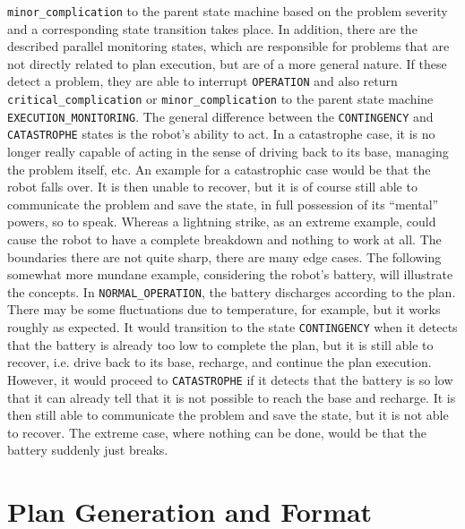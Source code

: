 \documentclass[english, master, utf8]{base/thesis_KBS}
\newcommand{\code}[1]{\colorbox{light-gray}{\texttt{#1}}}
\begin{document}
\code{minor\_complication} to the parent state machine based on the problem severity and a corresponding state transition takes place.
In addition, there are the described parallel monitoring states, which are responsible for problems that are not directly related to plan execution, but are of a more general nature.
If these detect a problem, they are able to interrupt \code{OPERATION} and also return \code{critical\_complication} or \code{minor\_complication} to the parent state machine
\code{EXECUTION\_MONITORING}.\newline
The general difference between the \code{CONTINGENCY} and \code{CATASTROPHE} states is the robot's ability to act. 
In a catastrophe case, it is no longer really capable of acting in the sense of driving back to its base, managing the problem itself, etc. 
An example for a catastrophic case would be that the robot falls over. It is then unable to recover, but it is of course still able to communicate the problem
and save the state, in full possession of its ``mental'' powers, so to speak. Whereas a lightning strike, as an extreme example, could cause the robot to have a 
complete breakdown and nothing to work at all. The boundaries there are not quite sharp, there are many edge cases.
The following somewhat more mundane example, considering the robot's battery, will illustrate the concepts.
In \code{NORMAL\_OPERATION}, the battery discharges according to the plan. There may be some fluctuations due to temperature, for example, but it works roughly as expected.
It would transition to the state \code{CONTINGENCY} when it detects that the battery is already too low to complete the plan, but it is still able to recover,
i.e. drive back to its base, recharge, and continue the plan execution. However, it would proceed to \code{CATASTROPHE} if it detects that the battery is so low
that it can already tell that it is not possible to reach the base and recharge. It is then still able to communicate the problem and save the state, but it is not able
to recover. The extreme case, where nothing can be done, would be that the battery suddenly just breaks.

\pagebreak

\section{Plan Generation and Format}
\label{sec:plan_generation}
\end{document}
